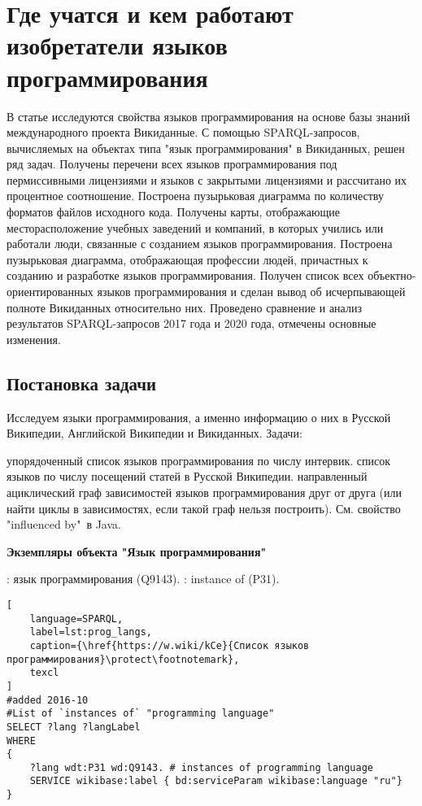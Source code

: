 \chapter{Где учатся и кем работают изобретатели языков программирования}
\label{ch:programming languages}

В статье исследуются свойства языков программирования на основе базы знаний международного проекта Викиданные. С помощью SPARQL-запросов, вычисляемых на объектах типа "язык программирования" в Викиданных, решен ряд задач. Получены перечени всех языков программирования под пермиссивными лицензиями и языков с закрытыми лицензиями и рассчитано их процентное соотношение. Построена пузырьковая диаграмма по количеству форматов файлов исходного кода. Получены карты, отображающие месторасположение учебных заведений и компаний, в которых учились или работали люди, связанные с созданием языков программирования. Построена пузырьковая диаграмма, отображающая профессии людей, причастных к созданию и разработке языков программирования. Получен список всех объектно-ориентированных языков программирования и сделан вывод об исчерпывающей полноте Викиданных относительно них. Проведено сравнение и анализ результатов SPARQL-запросов 2017 года и 2020 года, отмечены основные изменения. 

\section{Постановка задачи}
Исследуем языки программирования, а именно информацию о них в Русской Википедии, Английской Википедии и Викиданных.
Задачи:
\begin{enumerate} 
   упорядоченный список языков программирования по числу интервик.
   список языков по числу посещений статей в Русской Википедии.
   направленный ациклический граф зависимостей языков программирования друг от друга (или найти циклы в зависимостях, если такой граф нельзя построить). См. свойство "influenced by"\  в Java.
\end{enumerate}

\textbf{Экземпляры объекта "Язык программирования"}
\begin{itemize}
: язык программирования (Q9143).
: instance of (P31).
\end{itemize}

\begin{lstlisting}[
	language=SPARQL,
	label=lst:prog_langs,
	caption={\href{https://w.wiki/kCe}{Список языков программирования}\protect\footnotemark},
	texcl 
]
#added 2016-10
#List of `instances of` "programming language" 
SELECT ?lang ?langLabel
WHERE
{
    ?lang wdt:P31 wd:Q9143. # instances of programming language
    SERVICE wikibase:label { bd:serviceParam wikibase:language "ru"}
}
\end{lstlisting}


